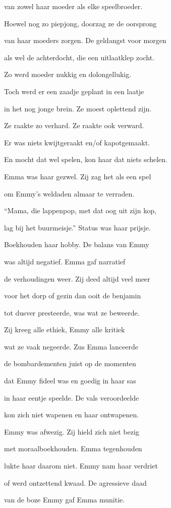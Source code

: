 van zowel haar moeder
als elke speelbroeder.

Hoewel nog zo piepjong,
doorzag ze de oorsprong

van haar moeders zorgen.
De geldangst voor morgen

als wel de achterdocht,
die een uitlaatklep zocht.

Zo werd moeder nukkig
en dolongellukig.

Toch werd er een zaadje
geplant in een laatje

in het nog jonge brein.
Ze moest oplettend zijn.

Ze raakte zo verhard.
Ze raakte ook verward.

Er was niets kwijtgeraakt
en/of kapotgemaakt.

En mocht dat wel spelen,
kon haar dat niets schelen.

Emma was haar gezwel.
Zij zag het als een spel

om Emmy’s weldaden
almaar te verraden.

“Mama, die lappenpop,
met dat oog uit zijn kop,

lag bij het buurmeisje.”
Status was haar prijsje.

Boekhouden haar hobby.
De balans van Emmy

was altijd negatief.
Emma gaf narratief

de verhoudingen weer.
Zij deed altijd veel meer

voor het dorp of gezin
dan ooit de benjamin

tot dusver presteerde,
was wat ze beweerde.

Zij kreeg alle ethiek,
Emmy alle kritiek

wat ze vaak negeerde.
Zus Emma lanceerde

de bombardementen
juist op de momenten

dat Emmy fideel was
en goedig in haar sas

in haar eentje speelde.
De vals veroordeelde

kon zich niet wapenen
en haar ontwapenen.

Emmy was afwezig.
Zij hield zich niet bezig

met moraalboekhouden.
Emma tegenhouden

lukte haar daarom niet.
Emmy nam haar verdriet

of werd ontzettend kwaad.
De agressieve daad

van de boze Emmy
gaf Emma munitie.
